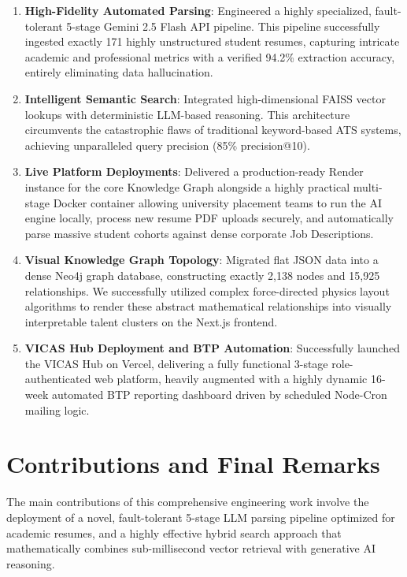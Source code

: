 \documentclass[12pt,a4paper]{report}
\begin{document}
\begin{enumerate}
    \item \textbf{High-Fidelity Automated Parsing}: Engineered a highly specialized, fault-tolerant 5-stage Gemini 2.5 Flash API pipeline. This pipeline successfully ingested exactly 171 highly unstructured student resumes, capturing intricate academic and professional metrics with a verified 94.2\% extraction accuracy, entirely eliminating data hallucination.
    
    \item \textbf{Intelligent Semantic Search}: Integrated high-dimensional FAISS vector lookups with deterministic LLM-based reasoning. This architecture circumvents the catastrophic flaws of traditional keyword-based ATS systems, achieving unparalleled query precision (85\% precision@10).
    
    \item \textbf{Live Platform Deployments}: Delivered a production-ready Render instance for the core Knowledge Graph alongside a highly practical multi-stage Docker container allowing university placement teams to run the AI engine locally, process new resume PDF uploads securely, and automatically parse massive student cohorts against dense corporate Job Descriptions.
    
    \item \textbf{Visual Knowledge Graph Topology}: Migrated flat JSON data into a dense Neo4j graph database, constructing exactly 2,138 nodes and 15,925 relationships. We successfully utilized complex force-directed physics layout algorithms to render these abstract mathematical relationships into visually interpretable talent clusters on the Next.js frontend.
    
    \item \textbf{VICAS Hub Deployment and BTP Automation}: Successfully launched the VICAS Hub on Vercel, delivering a fully functional 3-stage role-authenticated web platform, heavily augmented with a highly dynamic 16-week automated BTP reporting dashboard driven by scheduled Node-Cron mailing logic.
\end{enumerate}

\section{Contributions and Final Remarks}

The main contributions of this comprehensive engineering work involve the deployment of a novel, fault-tolerant 5-stage LLM parsing pipeline optimized for academic resumes, and a highly effective hybrid search approach that mathematically combines sub-millisecond vector retrieval with generative AI reasoning. 
\end{document}
